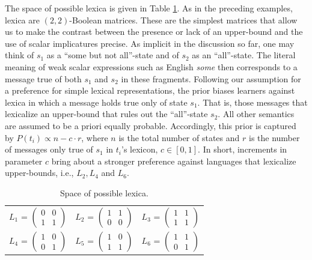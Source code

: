 \documentclass[a4paper]{article}
\begin{document}
The space of possible lexica is given in Table \ref{tab:lexica}. As in the preceding examples, lexica are $(2,2)$-Boolean matrices. These are the simplest matrices that allow us to make the contrast between the presence or lack of an upper-bound and the use of scalar implicatures precise. As implicit in the discussion so far, one may think of $s_1$ as a ``some but not all''-state and of $s_2$ as an ``all''-state. The literal meaning of weak scalar expressions such as English {\em some} then corresponds to a message true of both $s_1$ and $s_2$ in these fragments. Following our assumption for a preference for simple lexical representations, the prior biases learners against lexica in which a message holds true only of state $s_1$. That is, those messages that lexicalize an upper-bound that rules out the ``all''-state $s_2$. All other semantics are assumed to be a priori equally probable. Accordingly, this prior is captured by $P(t_i) \propto n - c \cdot r$, where $n$ is the total number of states and $r$ is the number of messages only true of $s_1$ in $t_i$'s lexicon, $c \in [0,1]$. In short, increments in parameter $c$ bring about a stronger preference against languages that lexicalize upper-bounds, i.e., $L_2, L_4$ and $L_6$.

\begin{table}[t]
\centering 
\begin{tabular}{l c l}
$L_1$ = $\begin{pmatrix} 0 & 0 \\ 1 & 1 \end{pmatrix}$ & 
$L_2$ = $\begin{pmatrix} 1 & 1 \\ 0 & 0 \end{pmatrix}$ & 
$L_3$ = $\begin{pmatrix} 1 & 1 \\ 1 & 1 \end{pmatrix}$\\[0.5cm]

$L_4$ = $\begin{pmatrix} 1 & 0 \\ 0 & 1 \end{pmatrix}$ &
$L_5$ = $\begin{pmatrix} 1 & 0 \\ 1 & 1 \end{pmatrix}$ &
$L_6$ = $\begin{pmatrix} 1 & 1 \\ 0 & 1 \end{pmatrix}$
\end{tabular}
\caption{Space of possible lexica.}
\label{tab:lexica}
\end{table}
\end{document}
